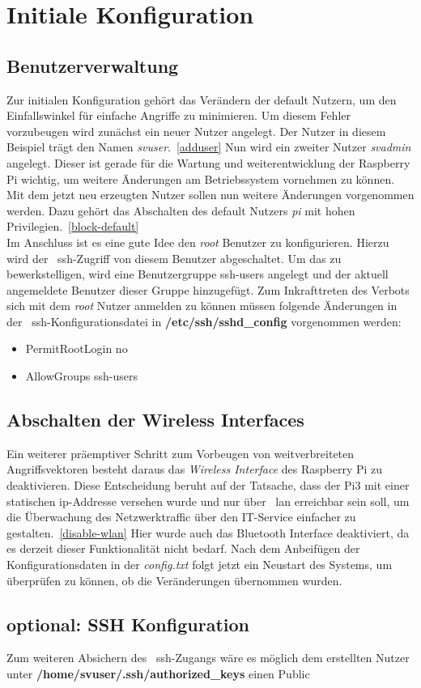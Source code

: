 
\section{Initiale Konfiguration}\label{sec:initiale-konfiguration}
\subsection{Benutzerverwaltung}\label{subsec: benutzerverwaltung}
Zur initialen Konfiguration gehört das Verändern der default Nutzern, um den Einfallswinkel für einfache Angriffe zu minimieren.
Um diesem Fehler vorzubeugen wird zunächst ein neuer Nutzer angelegt.
Der Nutzer in diesem Beispiel trägt den Namen \textit{svuser}.~\ref{adduser}
Nun wird ein zweiter Nutzer \textit{svadmin} angelegt.
Dieser ist gerade für die Wartung und weiterentwicklung der Raspberry Pi wichtig, um weitere Änderungen am Betriebssystem vornehmen zu können. \\
\blankline
Mit dem jetzt neu erzeugten Nutzer sollen nun weitere Änderungen vorgenommen werden.
Dazu gehört das Abschalten des default Nutzers \textit{pi} mit hohen Privilegien.~\ref{block-default} \\
\blankline
Im Anschluss ist es eine gute Idee den \textit{root} Benutzer zu konfigurieren.
Hierzu wird der ~\gls{ssh}-Zugriff von diesem Benutzer abgeschaltet.
Um das zu bewerkstelligen, wird eine Benutzergruppe ssh-users angelegt und der aktuell angemeldete Benutzer dieser Gruppe hinzugefügt.
Zum Inkrafttreten des Verbots sich mit dem \textit{root} Nutzer anmelden zu können müssen folgende Änderungen in der ~\gls{ssh}-Konfigurationsdatei in \textbf{/etc/ssh/sshd\_config} vorgenommen werden:
\begin{itemize}
    \item PermitRootLogin no
    \item AllowGroups ssh-users
\end{itemize}


\subsection{Abschalten der Wireless Interfaces}\label{subsec:abschalten-des-wireless-interface}
Ein weiterer präemptiver Schritt zum Vorbeugen von weitverbreiteten Angriffsvektoren besteht daraus das \textit{Wireless Interface} des Raspberry Pi zu deaktivieren.
Diese Entscheidung beruht auf der Tatsache, dass der Pi3 mit einer statischen \gls{ip}-Addresse versehen wurde und nur über ~\gls{lan} erreichbar sein soll, um die Überwachung
des Netzwerktraffic über den IT-Service einfacher zu gestalten.~\ref{disable-wlan}
Hier wurde auch das Bluetooth Interface deaktiviert, da es derzeit dieser Funktionalität nicht bedarf.
Nach dem Anbeifügen der Konfigurationsdaten in der \textit{config.txt} folgt jetzt ein Neustart des Systems, um überprüfen zu können, ob die Veränderungen übernommen wurden.
\subsection{optional: SSH Konfiguration}\label{subsec:ssh-konfiguration}
Zum weiteren Absichern des ~\gls{ssh}-Zugangs wäre es möglich dem erstellten Nutzer unter \textbf{/home/svuser/.ssh/authorized\_keys} einen Public 